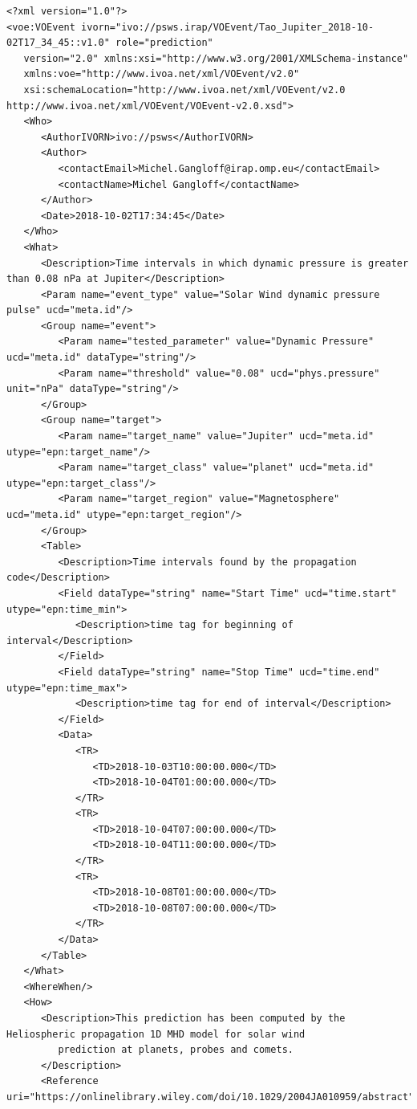 \documentclass[referee,a4paper,12pt,traditabstract]{swsc}
\begin{document}
\begin{linenumbers}
{\tiny 
\begin{verbatim}
<?xml version="1.0"?>
<voe:VOEvent ivorn="ivo://psws.irap/VOEvent/Tao_Jupiter_2018-10-02T17_34_45::v1.0" role="prediction"
   version="2.0" xmlns:xsi="http://www.w3.org/2001/XMLSchema-instance"
   xmlns:voe="http://www.ivoa.net/xml/VOEvent/v2.0"
   xsi:schemaLocation="http://www.ivoa.net/xml/VOEvent/v2.0 http://www.ivoa.net/xml/VOEvent/VOEvent-v2.0.xsd">
   <Who>
      <AuthorIVORN>ivo://psws</AuthorIVORN>
      <Author>
         <contactEmail>Michel.Gangloff@irap.omp.eu</contactEmail>
         <contactName>Michel Gangloff</contactName>
      </Author>
      <Date>2018-10-02T17:34:45</Date>
   </Who>
   <What>
      <Description>Time intervals in which dynamic pressure is greater than 0.08 nPa at Jupiter</Description>
      <Param name="event_type" value="Solar Wind dynamic pressure pulse" ucd="meta.id"/>
      <Group name="event">
         <Param name="tested_parameter" value="Dynamic Pressure" ucd="meta.id" dataType="string"/>
         <Param name="threshold" value="0.08" ucd="phys.pressure" unit="nPa" dataType="string"/>
      </Group>
      <Group name="target">
         <Param name="target_name" value="Jupiter" ucd="meta.id" utype="epn:target_name"/>
         <Param name="target_class" value="planet" ucd="meta.id" utype="epn:target_class"/>
         <Param name="target_region" value="Magnetosphere" ucd="meta.id" utype="epn:target_region"/>
      </Group>
      <Table>
         <Description>Time intervals found by the propagation code</Description>
         <Field dataType="string" name="Start Time" ucd="time.start" utype="epn:time_min">
            <Description>time tag for beginning of interval</Description>
         </Field>
         <Field dataType="string" name="Stop Time" ucd="time.end" utype="epn:time_max">
            <Description>time tag for end of interval</Description>
         </Field>
         <Data>
            <TR>
               <TD>2018-10-03T10:00:00.000</TD>
               <TD>2018-10-04T01:00:00.000</TD>
            </TR>
            <TR>
               <TD>2018-10-04T07:00:00.000</TD>
               <TD>2018-10-04T11:00:00.000</TD>
            </TR>
            <TR>
               <TD>2018-10-08T01:00:00.000</TD>
               <TD>2018-10-08T07:00:00.000</TD>
            </TR>
         </Data>
      </Table>
   </What>
   <WhereWhen/>
   <How>
      <Description>This prediction has been computed by the Heliospheric propagation 1D MHD model for solar wind 
         prediction at planets, probes and comets.
      </Description>
      <Reference uri="https://onlinelibrary.wiley.com/doi/10.1029/2004JA010959/abstract"/>

\end{verbatim}}
\end{linenumbers}
\end{document}
